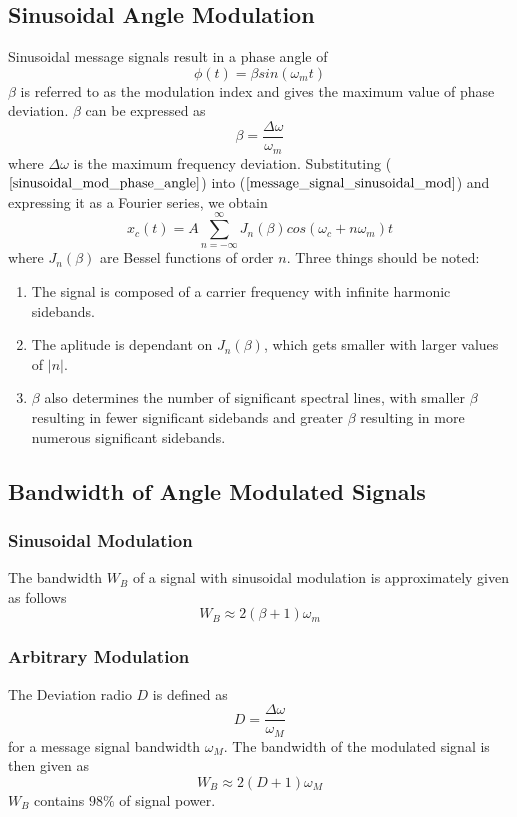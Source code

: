 \documentclass[]{article}
\begin{document}
\subsection{Sinusoidal Angle Modulation}
Sinusoidal message signals result in a phase angle of
\begin{equation} \phi(t) = \beta sin(\omega_{m}t) \label{sinusoidal_mod_phase_angle}\end{equation}
$\beta$ is referred to as the modulation index and gives the maximum value of phase deviation. $\beta$ can be expressed as 
\begin{equation} \beta = \frac{\Delta \omega}{\omega_{m}} \end{equation}
where $\Delta \omega$ is the maximum frequency deviation. Substituting ($\ref{sinusoidal_mod_phase_angle}$) into ($\ref{message_signal_sinusoidal_mod}$) and expressing it as a Fourier series, we obtain
\begin{equation} x_{c}(t) = A \sum_{n=-\infty}^{\infty} J_{n}(\beta)cos(\omega_{c}+n\omega_{m})t \end{equation}
where $J_{n}(\beta)$ are Bessel functions of order $n$. Three things should be noted:
\begin{enumerate}
	\item The signal is composed of a carrier frequency with infinite harmonic sidebands.
	\item The aplitude is dependant on $J_{n}(\beta)$, which gets smaller with larger values of $|n|$.
	\item $\beta$ also determines the number of significant spectral lines, with smaller $\beta$ resulting in fewer significant sidebands and greater $\beta$ resulting in more numerous significant sidebands.
\end{enumerate}
\subsection{Bandwidth of Angle Modulated Signals}
\subsubsection{Sinusoidal Modulation}
The bandwidth $W_{B}$ of a signal with sinusoidal modulation is approximately given as follows
\begin{equation} W_{B} \approx 2(\beta + 1)\omega_{m} \end{equation}
\subsubsection{Arbitrary Modulation}
The Deviation radio $D$ is defined as
\begin{equation} D = \frac{\Delta \omega}{\omega_{M}} \end{equation}
for a message signal bandwidth $\omega_{M}$. The bandwidth of the modulated signal is then given as
\begin{equation} W_{B} \approx 2(D +1)\omega_{M} \end{equation}
$W_{B}$ contains $98\%$ of signal power.
\end{document}
